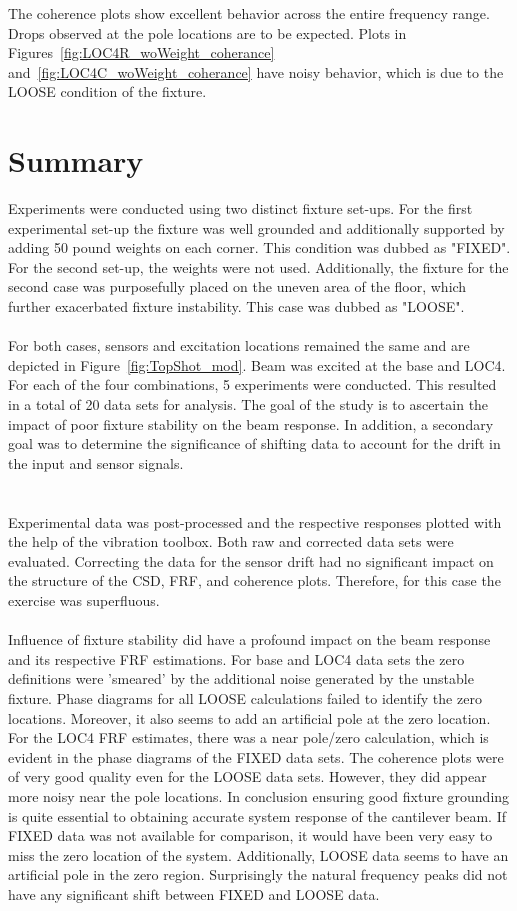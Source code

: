 \documentclass[paper=a4, fontsize=12pt]{scrartcl} %
\begin{document}
%
The coherence plots show excellent behavior across the entire frequency range. Drops observed at the pole locations are to be expected. Plots in Figures~\ref{fig:LOC4R_woWeight_coherance} and~\ref{fig:LOC4C_woWeight_coherance} have noisy behavior, which is due to the LOOSE condition of the fixture.
%
%
\section*{Summary}
%
Experiments were conducted using two distinct fixture set-ups. For the first experimental set-up the fixture was well grounded and additionally supported by adding 50 pound weights on each corner. This condition was dubbed as "FIXED". For the second set-up, the weights were not used. Additionally, the fixture for the second case was purposefully placed on the uneven area of the floor, which further exacerbated fixture instability. This case was dubbed as "LOOSE".  
\\
\\
For both cases, sensors and excitation locations remained the same and are depicted in Figure~\ref{fig:TopShot_mod}. Beam was excited at the base and LOC4. For each of the four combinations, 5 experiments were conducted. This resulted in a total of 20 data sets for analysis. The goal of the study is to ascertain the impact of poor fixture stability on the beam response. In addition, a secondary goal was to determine the significance of shifting data to account for the drift in the input and sensor signals.  
\\
\\
\\
Experimental data was post-processed and the respective responses plotted with the help of the vibration toolbox. Both raw and corrected data sets were evaluated. Correcting the data for the sensor drift had no significant impact on the structure of the CSD, FRF, and coherence plots. Therefore, for this case the exercise was superfluous. 
\\
\\
Influence of fixture stability did have a profound impact on the beam response and its respective FRF estimations. For base and LOC4 data sets the zero definitions were 'smeared' by the additional noise generated by the unstable fixture. Phase diagrams for all LOOSE calculations failed to identify the zero locations. Moreover, it also seems to add an artificial pole at the zero location. For the LOC4 FRF estimates, there was a near pole/zero calculation, which is evident in the phase diagrams of the FIXED data sets. The coherence plots were of very good quality even for the LOOSE data sets. However, they did appear more noisy near the pole locations. In conclusion ensuring good fixture grounding is quite essential to obtaining accurate system response of the cantilever beam. If FIXED data was not available for comparison, it would have been very easy to miss the zero location of the system. Additionally, LOOSE data seems to have an artificial pole in the zero region. Surprisingly the natural frequency peaks did not have any significant shift between FIXED and LOOSE data.
\end{document}
